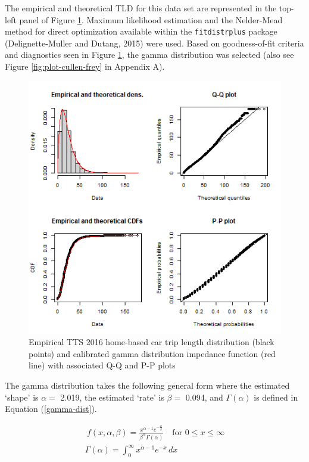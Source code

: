\documentclass[]{elsarticle} %
\begin{document}
The empirical and theoretical TLD for this data set are represented in
the top-left panel of Figure \ref{fig:TLD-Gamma-plot}. Maximum
likelihood estimation and the Nelder-Mead method for direct optimization
available within the \texttt{fitdistrplus} package (Delignette-Muller
and Dutang, 2015) were used. Based on goodness-of-fit criteria and
diagnostics seen in Figure \ref{fig:TLD-Gamma-plot}, the gamma
distribution was selected (also see Figure \ref{fig:plot-cullen-frey} in
Appendix A).

\begin{figure}

{\centering \includegraphics[width=0.8\linewidth]{images/impedance_function} 

}

\caption{\label{fig:TLD-Gamma-plot}Empirical TTS 2016 home-based car trip length distribution (black points) and calibrated gamma distribution impedance function (red line) with associated Q-Q and P-P plots}\label{fig:TLD-Gamma-plot}
\end{figure}

The gamma distribution takes the following general form where the
estimated `shape' is \(\alpha=\) 2.019, the estimated `rate' is
\(\beta =\) 0.094, and \(\Gamma(\alpha)\) is defined in Equation
(\ref{gamma-dist}).

\begin{equation}
\label{gamma-dist}
\begin{array}{l}\ 
f(x, \alpha, \beta) = \frac {x^{\alpha-1}e^{-\frac{x}{\beta}}}{ \beta^{\alpha}\Gamma(\alpha)} \quad \text{for } 0 \leq x \leq \infty\\

\Gamma(\alpha) =  \int_{0}^{\infty} x^{\alpha-1}e^{-x} \,dx\\
\end{array}
\end{equation}
\end{document}
